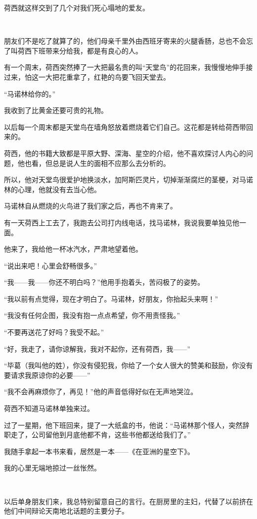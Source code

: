 \par 荷西就这样交到了几个对我们死心塌地的爱友。
\par  
\par 朋友们不是吃了就算了的，他们母亲千里外由西班牙寄来的火腿香肠，总也不会忘了叫荷西下班带来分给我，都是有良心的人。
\par 有一个周末，荷西突然捧了一大把最名贵的叫“天堂鸟”的花回来，我慢慢地伸手接过来，怕这一大把花重拿了，红艳的鸟要飞回天堂去。
\par “马诺林给你的。”
\par 我收到了比黄金还要可贵的礼物。
\par 以后每一个周末都是天堂鸟在墙角怒放着燃烧着它们自己。这花都是转给荷西带回来的。
\par 荷西，他的书籍大致都是平原大野、深海、星空的介绍，他不喜欢探讨人内心的问题，他也看，但总是说人生的面相不应那么去分析的。
\par 所以，他对天堂鸟很爱护地换淡水，加阿斯匹灵片，切掉渐渐腐烂的茎梗，对马诺林的心理，他就没有去当心他。
\par 马诺林自从燃烧的火鸟进了我们家之后，再也不肯来了。
\par 有一天荷西上工去了，我跑去公司打内线电话，找马诺林，我说我要单独见他一面。
\par 他来了，我给他一杯冰汽水，严肃地望着他。
\par “说出来吧！心里会舒畅很多。”
\par “我——我——你还不明白吗？”他用手抱着头，苦闷极了的姿势。
\par “我以前有点觉得，现在才明白了。马诺林，好朋友，你抬起头来啊！”
\par “我没有任何企图，我没有抱一点点希望，你不用责怪我。”
\par “不要再送花了好吗？我受不起。”
\par “好，我走了，请你谅解我，我对不起你，还有荷西，我——”
\par “毕葛（我叫他的姓），你没有侵犯我，你给了一个女人很大的赞美和鼓励，你没有要请求我原谅你的必要——”
\par “我不会再麻烦你了，再见！”他的声音低得好似在无声地哭泣。
\par 荷西不知道马诺林单独来过。
\par 过了一星期，他下班回来，提了一大纸盒的书，他说：“马诺林那个怪人，突然辞职走了，公司留他到月底他都不肯，这些书他都送给我们了。”
\par 我随手拿起一本书来看，居然是一本——《在亚洲的星空下》。
\par 我的心里无端地掠过一丝怅然。
\par  
\par 以后单身朋友们来，我总特别留意自己的言行。在厨房里的主妇，代替了以前挤在他们中间辩论天南地北话题的主要分子。
